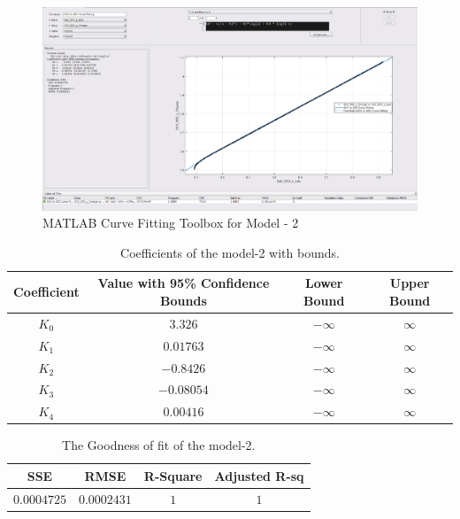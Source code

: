 \documentclass[12pt]{article}
\begin{document}
\begin{appendices}
\begin{figure}[t!]
	\centering
	\includegraphics[width=1.0\textwidth, keepaspectratio]{images/Curve_Fitting_2.pdf}
	\caption{MATLAB Curve Fitting Toolbox for Model - 2}
	\label{fig:OCV_SOC_Model_2}
\end{figure}

\begin{table}[h]
	\center
	\begin{tabular}{||c | c | c | c ||} 
		\hline
		Coefficient & Value with 95\% Confidence Bounds & Lower Bound & Upper Bound \\ [0.5ex] 
		\hline\hline
		$K_{0}$ & $3.326$  & $-\infty$ & $\infty$ \\ 
		\hline
		$K_{1}$ & $0.01763$ & $-\infty$ & $\infty$ \\
		\hline
		$K_{2}$ & $-0.8426$ & $-\infty$ & $\infty$ \\
		\hline
		$K_{3}$ & $-0.08054$ & $-\infty$ & $\infty$ \\
		\hline
		$K_{4}$ & $0.00416$ & $-\infty$ & $\infty$ \\
		\hline
	\end{tabular}
	\caption{\label{table:OCV_SOC_Model_2_1}Coefficients of the model-2 with bounds.}
\end{table}

\begin{table}[h]
	\center
	\begin{tabular}{||c | c | c | c ||} 
		\hline
		SSE & RMSE & R-Square & Adjusted R-sq\\ [0.5ex] 
		\hline\hline
		$0.0004725$ & $0.0002431$  & $1$ & $1$ \\ 
		\hline
	\end{tabular}
	\caption{\label{table:OCV_SOC_Model_2_2}The Goodness of fit of the model-2.}
\end{table}


\end{appendices}
\end{document}
